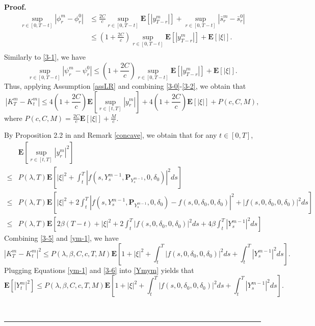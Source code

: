 \documentclass[10pt]{article}%
\numberwithin{equation}{section}
\newenvironment{proof}[1][Proof]{\noindent \textbf{#1.} }{\  \rule{0.5em}{0.5em}}
\def \E{\mathbf{E}}
\def \P{\mathbf{P}}
\begin{document}
\begin{proof}
\begin{equation}
\begin{split}
  \sup_{r\in[0,T-t]}\left|\phi_r^m-\phi_r^{0}\right|&\leq \frac{2C}{c}\sup_{r\in[0,T-t]}\mathbf{E}\left[\left|y^{m}_{T-r}\right|\right]+\sup_{r\in[0,T-t]}\left|\bar{s}_r^m-\bar{s}_r^{0}\right|\\
  &\leq \left(1+\frac{2C}{c}\right)\sup_{r\in[0,T-t]}\mathbf{E}\left[\left|y^{m}_{T-r}\right|\right]+\mathbf{E}\left[\left|\xi\right|\right].\\  \end{split}  
  \end{equation}
Similarly to \eqref{3-1}, we have 
\begin{equation}\label{3-2}
  \sup_{r\in[0,T-t]}\left|\psi_r^m-\psi_r^{0}\right| \leq \left(1+\frac{2C}{c}\right)\sup_{r\in[0,T-t]}\mathbf{E}\left[\left|y^{m}_{T-r}\right|\right]+\mathbf{E}\left[\left|\xi\right|\right].
  \end{equation}
 Thus, applying Assumption \ref{assLR} and combining \eqref{3-0}-\eqref{3-2}, we obtain that 
  \begin{equation}\label{3-5}
  \left|K_{T}^{m}-K_{t}^{m}\right|\leq 4\left(1+\frac{2C}{c}\right)\mathbf{E}\left[\sup_{r\in[t,T]}\left|y^{m}_{r}\right|\right]+4\left(1+\frac{2C}{c}\right)\mathbf{E}\left[\left|\xi\right|\right]+P(c,C,M),
  \end{equation} 
  where $P(c,C,M)=\frac{2C}{c}\E[\left|\xi\right|]+\frac{M}{c}$.
  
 By Proposition 2.2 in \cite{LLZ} and  Remark \ref{concave}, we obtain that for any $t\in[0,T]$,
 \begin{equation}
 \begin{split}\label{ym-1}
&\E\left[\sup_{r\in[t,T]}\left|y_r^m\right|^2\right]\\
\leq& P(\lambda,T)\E\left[\left|\xi\right|^2+\int_{t}^{T}\left|f(s,Y_s^{m-1},\P_{Y_s^{m-1}},0,\delta_0)\right|^2ds\right]\\
\leq& P(\lambda,T)\E\left[\left|\xi\right|^2+2\int_{t}^{T}\left|f(s,Y_s^{m-1},\P_{Y_s^{m-1}},0,\delta_0)-f(s,0,\delta_0,0,\delta_0)\right|^2+\left|f(s,0,\delta_0,0,\delta_0)\right|^2ds\right]\\
\leq& P(\lambda,T)\E\left[2\beta(T-t)+\left|\xi\right|^2+2\int_{t}^{T}\left|f(s,0,\delta_0,0,\delta_0)\right|^2ds+4\beta\int_{t}^{T}\left|Y_s^{m-1}\right|^2ds\right]
 \end{split}  
 \end{equation}
 Combining \eqref{3-5} and \eqref{ym-1}, we have
  \begin{equation}\label{3-6}
  \left|K_{T}^{m}-K_{t}^{m}\right|^2
  \leq P(\lambda,\beta,C,c,T,M)\E\left[1+\left|\xi\right|^2+\int_{t}^{T}\left|f(s,0,\delta_0,0,\delta_0)\right|^2ds+\int_{t}^{T}\left|Y_s^{m-1}\right|^2ds\right].   
  \end{equation} 
Plugging Equations \eqref{ym-1} and \eqref{3-6} into \eqref{Ymym} yields that 
\begin{equation*}
\label{3-7}
\mathbf{E} [\left|Y_t^m\right|^2]
\leq P(\lambda,\beta,C,c,T,M)\E\left[1+\left|\xi\right|^2+\int_{t}^{T}\left|f(s,0,\delta_0,0,\delta_0)\right|^2ds+\int_{t}^{T}\left|Y_s^{m-1}\right|^2ds\right].     
\end{equation*}


\end{proof}
\end{document}
